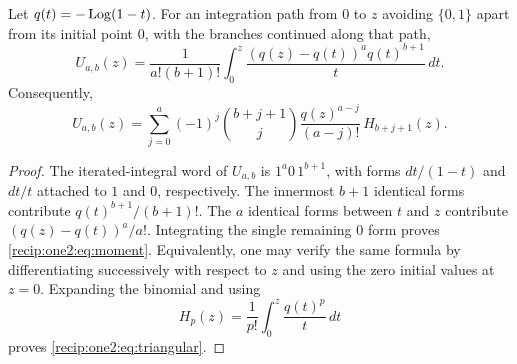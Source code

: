 \begin{lemma}
\label{recip:one2:lem:moment}
Let $q(t)=-\operatorname{Log}(1-t)$.  For an integration path from $0$ to $z$ avoiding
$\{0,1\}$ apart from its initial point $0$, with the branches
continued along that path,
\begin{equation}
 U_{a,b}(z)=\frac1{a!(b+1)!}
 \int_0^z\frac{(q(z)-q(t))^a q(t)^{b+1}}{t}\,dt.
 \label{recip:one2:eq:moment}
\end{equation}
Consequently,
\begin{equation}
 U_{a,b}(z)=\sum_{j=0}^a(-1)^j
 \binom{b+j+1}{j}\frac{q(z)^{a-j}}{(a-j)!}\,H_{b+j+1}(z).
 \label{recip:one2:eq:triangular}
\end{equation}
\end{lemma}
\begin{proof}
The iterated-integral word of $U_{a,b}$ is
$1^a0\,1^{b+1}$, with forms $dt/(1-t)$ and $dt/t$ attached to $1$ and
$0$, respectively.  The innermost $b+1$ identical forms contribute
$q(t)^{b+1}/(b+1)!$.  The $a$ identical forms between $t$ and $z$
contribute $(q(z)-q(t))^a/a!$.  Integrating the single remaining $0$
form proves \eqref{recip:one2:eq:moment}.  Equivalently, one may verify the
same formula by differentiating successively with respect to $z$ and
using the zero initial values at $z=0$.  Expanding the binomial and
using
\[
 H_p(z)=\frac1{p!}\int_0^z\frac{q(t)^p}{t}\,dt
\]
proves \eqref{recip:one2:eq:triangular}.
\end{proof}

